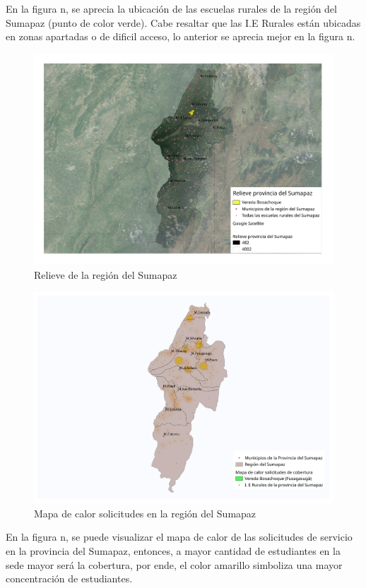 \documentclass[]{article}
\begin{document}
En la figura n, se aprecia la ubicación de las escuelas rurales de la
región del Sumapaz (punto de color verde). Cabe resaltar que las I.E
Rurales están ubicadas en zonas apartadas o de dificil acceso, lo
anterior se aprecia mejor en la figura n.

\begin{figure}
\centering
\includegraphics{relieve_sumapaz_escuela.pdf}
\caption{Relieve de la región del Sumapaz}
\end{figure}

\begin{figure}
\centering
\includegraphics{calor_s.pdf}
\caption{Mapa de calor solicitudes en la región del Sumapaz}
\end{figure}

En la figura n, se puede visualizar el mapa de calor de las solicitudes
de servicio en la provincia del Sumapaz, entonces, a mayor cantidad de
estudiantes en la sede mayor será la cobertura, por ende, el color
amarillo simboliza una mayor concentración de estudiantes.
\end{document}
